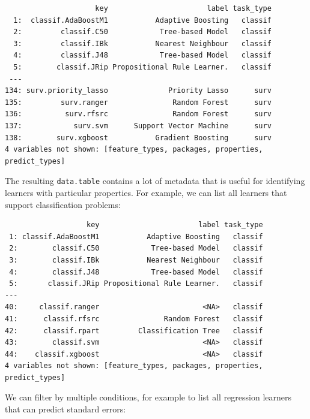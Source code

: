 \begin{verbatim}
                     key                       label task_type
  1:  classif.AdaBoostM1           Adaptive Boosting   classif
  2:         classif.C50            Tree-based Model   classif
  3:         classif.IBk           Nearest Neighbour   classif
  4:         classif.J48            Tree-based Model   classif
  5:        classif.JRip Propositional Rule Learner.   classif
 ---                                                          
134: surv.priority_lasso              Priority Lasso      surv
135:         surv.ranger               Random Forest      surv
136:          surv.rfsrc               Random Forest      surv
137:            surv.svm      Support Vector Machine      surv
138:        surv.xgboost           Gradient Boosting      surv
4 variables not shown: [feature_types, packages, properties, predict_types]
\end{verbatim}

The resulting \texttt{data.table} contains a lot of metadata that is
useful for identifying learners with particular properties. For example,
we can list all learners that support classification problems:

\begin{Shaded}
\begin{Highlighting}[]
\NormalTok{learners\_dt[task\_type }\SpecialCharTok{==} \NormalTok{]}
\end{Highlighting}
\end{Shaded}

\begin{verbatim}
                   key                       label task_type
 1: classif.AdaBoostM1           Adaptive Boosting   classif
 2:        classif.C50            Tree-based Model   classif
 3:        classif.IBk           Nearest Neighbour   classif
 4:        classif.J48            Tree-based Model   classif
 5:       classif.JRip Propositional Rule Learner.   classif
---                                                         
40:     classif.ranger                        <NA>   classif
41:      classif.rfsrc               Random Forest   classif
42:      classif.rpart         Classification Tree   classif
43:        classif.svm                        <NA>   classif
44:    classif.xgboost                        <NA>   classif
4 variables not shown: [feature_types, packages, properties, predict_types]
\end{verbatim}

We can filter by multiple conditions, for example to list all regression
learners that can predict standard errors:

